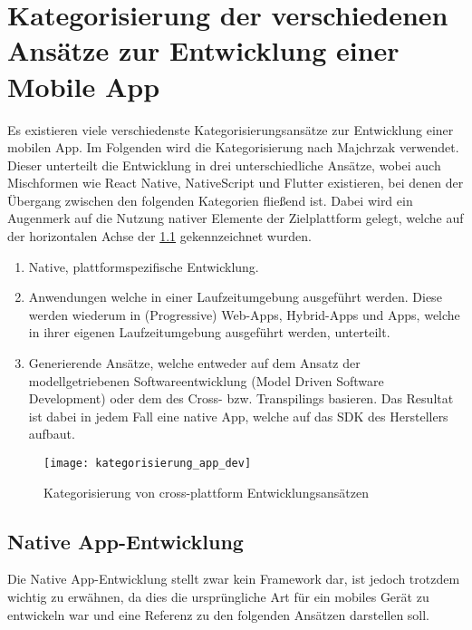 \chapter{Kategorisierung der verschiedenen Ansätze zur Entwicklung einer Mobile App}

Es existieren viele verschiedenste Kategorisierungsansätze zur Entwicklung einer mobilen App. Im Folgenden wird die Kategorisierung nach Majchrzak verwendet\cite{Majchrzak_category}. Dieser unterteilt die Entwicklung in drei unterschiedliche Ansätze, wobei auch Mischformen wie React Native, NativeScript und Flutter existieren, bei denen der Übergang zwischen den folgenden Kategorien fließend ist\cite{rieger_evaluation}. Dabei wird ein Augenmerk auf die Nutzung nativer Elemente der Zielplattform gelegt, welche auf der horizontalen Achse der \foreignlanguage{ngerman}{\cref{fig:kategorisierung_app_dev}} gekennzeichnet wurden.

\begin{enumerate}
	\item Native, plattformspezifische Entwicklung.
	\item Anwendungen welche in einer Laufzeitumgebung ausgeführt werden. Diese werden wiederum in (Progressive) Web-Apps, Hybrid-Apps und Apps, welche in ihrer eigenen Laufzeitumgebung ausgeführt werden, unterteilt.
	\item Generierende Ansätze, welche entweder auf dem Ansatz der modellgetriebenen Softwareentwicklung (Model Driven Software Development) oder dem des Cross- bzw. Transpilings basieren. Das Resultat ist dabei in jedem Fall eine native App, welche auf das \ac{SDK} des Herstellers aufbaut.
\end{enumerate}

\begin{figure}[h]
	\texttt{[image: kategorisierung\_app\_dev]}
	\centering
	\caption[Kategorisierung von cross-plattform Entwicklungsansätzen]{Kategorisierung von cross-plattform Entwicklungsansätzen \cite{Majchrzak_category}}
	\label{fig:kategorisierung_app_dev}
\end{figure}

\newpage
\section{Native App-Entwicklung}

Die Native App-Entwicklung stellt zwar kein Framework dar, ist jedoch trotzdem wichtig zu erwähnen, da dies die ursprüngliche Art für ein mobiles Gerät zu entwickeln war und eine Referenz zu den folgenden Ansätzen darstellen soll.\\

